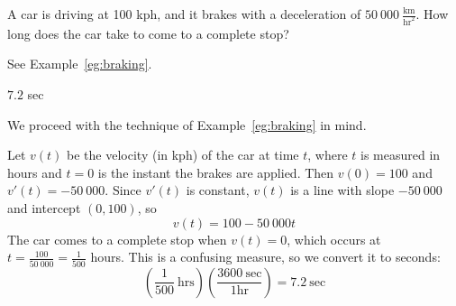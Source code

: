 \begin{question}
A car is driving at 100 kph, and it brakes with a deceleration of $50~000~ \frac{\mathrm{km}}{\mathrm{hr}^2}$. How long does the car take to come to a complete stop?
\end{question}
\begin{hint}
See Example~\ref*{eg:braking}.
\end{hint}
\begin{answer}
$7.2$ sec
\end{answer}
\begin{solution}
We proceed with the technique of Example~\ref*{eg:braking} in mind.

Let $v(t)$ be the velocity (in kph) of the car at time $t$, where $t$ is measured in hours and $t=0$ is the instant the brakes are applied. Then $v(0)=100$ and $v'(t)=-50~000$. Since $v'(t)$ is constant, $v(t)$ is a line with slope $-50~000$ and intercept $(0,100)$, so
\[v(t)=100-50~000t\]
The car comes to a complete stop when $v(t)=0$, which occurs at $t=\frac{100}{50~000}=\frac{1}{500}$ hours. This is a confusing measure, so we convert it to seconds:
\[\left(\frac{1}{500}~\mathrm{hrs}\right)\left(\frac{3600~\mathrm{sec}}{1 \mathrm{hr}}\right)=7.2~\mathrm{sec}\]
\end{solution}





